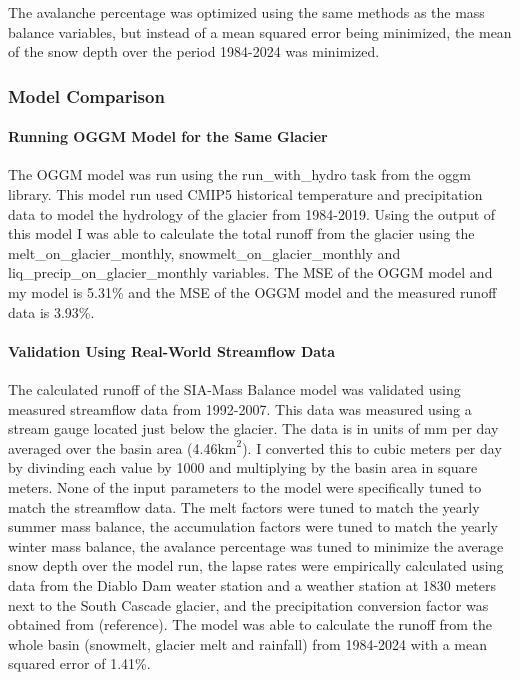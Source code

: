 \documentclass{article}
\begin{document}
The avalanche percentage was optimized using the same methods as the mass balance variables, but instead of a mean squared error being 
minimized, the mean of the snow depth over the period 1984-2024 was minimized. 

\subsubsection{Model Comparison}
\paragraph{Running OGGM Model for the Same Glacier}

The OGGM model was run using the run\_with\_hydro task from the oggm library. This model run used CMIP5 historical temperature and 
precipitation data to model the hydrology of the glacier from 1984-2019. Using the output of this model I was able to calculate the total 
runoff from the glacier using the melt\_on\_glacier\_monthly, snowmelt\_on\_glacier\_monthly and liq\_precip\_on\_glacier\_monthly variables. 
The MSE of the OGGM model and my model is 5.31\% and the MSE of the OGGM model and the measured runoff data is 3.93\%.

\paragraph{Validation Using Real-World Streamflow Data }

The calculated runoff of the SIA-Mass Balance model was validated using measured streamflow data from 1992-2007. This data was measured using 
a stream gauge located just below the glacier. The data is in units of mm per day averaged over the basin area (4.46$\text{km}^2$). I 
converted this to cubic meters per day by divinding each value by 1000 and multiplying by the basin area in square meters. None of the input 
parameters to the model were specifically tuned to match the streamflow data. The melt factors were tuned to match the yearly summer mass 
balance, the accumulation factors were tuned to match the yearly winter mass balance, the avalance percentage was tuned to minimize the 
average snow depth over the model run, the lapse rates were empirically calculated using data from the Diablo Dam weater station and a weather station 
at 1830 meters next to the South Cascade glacier, and the precipitation conversion factor was obtained from (reference). The model was able 
to calculate the runoff from the whole basin (snowmelt, glacier melt and rainfall) from 1984-2024 with a mean squared error of 1.41\%.
\end{document}
